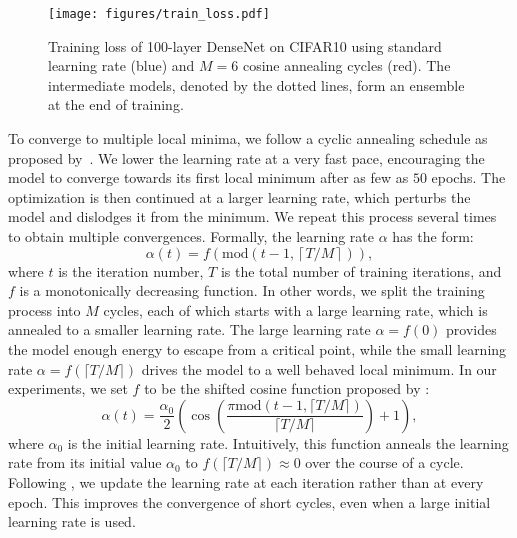 \begin{wrapfigure}{r}{0.5\textwidth}
    \texttt{[image: figures/train\_loss.pdf]}
    \caption{\small Training loss of 100-layer DenseNet on CIFAR10 using standard learning rate (blue) and $M=6$ cosine annealing cycles (red). The intermediate models, denoted by the dotted lines, form an ensemble at the end of training.}
    \label{fig:loss_curve}
\end{wrapfigure}
To converge to multiple local minima, we follow a cyclic annealing schedule as proposed by~\citet{loshchilov2016sgdr}.
We  lower the learning rate at a very fast pace, encouraging the model to converge towards its first local minimum after as few as $50$ epochs. The optimization is then continued at a larger learning rate, which perturbs the model and dislodges it from the minimum. We repeat this process several times to obtain multiple convergences.
Formally, the learning rate $\alpha$ has the form:
%
\begin{equation}
\label{eq:lr-cycle}
\alpha(t) = f \left(\text{mod}\left(t-1,\left\lceil T/M \right\rceil\right)\right),
\end{equation}
%
where $t$ is the iteration number, $T$ is the total number of training iterations, and $f$ is a monotonically decreasing function.
In other words, we split the training process into $M$ cycles, each of which starts with a large learning rate, which is annealed to a smaller learning rate. The large learning rate $\alpha=f(0)$ provides the model enough energy to escape from a critical point, while the small learning rate $\alpha=f(\lceil T/M \rceil)$ drives the model to a well behaved local minimum. In our experiments, we set $f$ to be the shifted cosine function proposed by \cite{loshchilov2016sgdr}:
\begin{equation}
\label{eq:lr-cosine}
\alpha(t) = \frac{\alpha_0}{2}\left(\cos\left(\frac{\pi\text{mod}(t-1,\lceil T/M\rceil)}{\lceil T/M\rceil}\right)+1\right),
\end{equation}
%
where $\alpha_0$ is the initial learning rate.
Intuitively, this function anneals the learning rate from its initial value $\alpha_0$ to $f(\lceil T/M \rceil) \approx 0$ over the course of a cycle. Following \citep{loshchilov2016sgdr}, we update the learning rate at each iteration rather than at every epoch. This improves the convergence of short cycles, even when a large initial learning rate is used.

